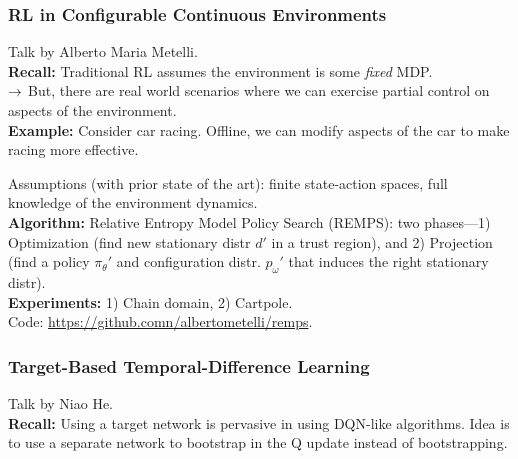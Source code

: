 \subsubsection{RL in Configurable Continuous Environments~\cite{metelli2019reinforcement}}

Talk by Alberto Maria Metelli. \\

{\bf Recall:} Traditional RL assumes the environment is some {\it fixed} MDP. \\

$\rightarrow$ But, there are real world scenarios where we can exercise partial control on aspects of the environment. \\

{\bf Example:} Consider car racing. Offline, we can modify aspects of the car to make racing more effective. \\


Assumptions (with prior state of the art): finite state-action spaces, full knowledge of the environment dynamics. \\

{\bf Algorithm:} Relative Entropy Model Policy Search (REMPS): two phases---1) Optimization (find new stationary distr $d'$ in a trust region), and 2) Projection (find a policy $\pi_\theta'$ and configuration distr. $p_\omega'$ that induces the right stationary distr). \\

{\bf Experiments:} 1) Chain domain, 2) Cartpole. \\

Code: \url{https://github.comn/albertometelli/remps}.

\spacerule

\subsubsection{Target-Based Temporal-Difference Learning~\cite{lee2019target}}

Talk by Niao He. \\

{\bf Recall:} Using a target network is pervasive in using DQN-like algorithms. Idea is to use a separate network to bootstrap in the Q update instead of bootstrapping. \\


